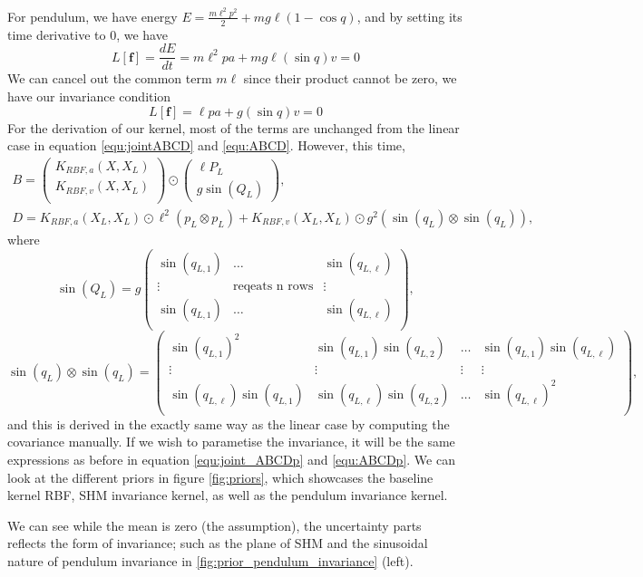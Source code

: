 \documentclass{statsmsc}
\begin{document}
For pendulum, we have energy $E=\frac{m\ell^2p^2}{2}+mg\ell(1-\cos q)$, and by setting its time derivative to 0, we have 
$$L[\mathbf{f}]=\frac{dE}{dt}=m\ell^2pa+mg\ell(\sin q)v=0$$
We can cancel out the common term $m\ell$ since their product cannot be zero, we have our invariance condition 
$$L[\mathbf{f}]=\ell pa+g(\sin q)v=0$$
For the derivation of our kernel, most of the terms are unchanged from the linear case in equation \ref{equ:jointABCD} and \ref{equ:ABCD}. 
However, this time, 
$$
\begin{gathered}
B=\begin{pmatrix}
    K_{RBF,a}(X, X_L) \\ K_{RBF,v}(X, X_L) \\
\end{pmatrix}\odot \begin{pmatrix}
    \ell P_L \\ g\sin(Q_L)
\end{pmatrix},\\ D=K_{RBF,a}(X_L, X_L)\odot \ell^2(p_L\otimes p_L) + K_{RBF,v}(X_L, X_L)\odot g^2(\sin(q_L)\otimes \sin(q_L)),
\end{gathered}
$$
where 
$$
\sin(Q_L) = g\begin{pmatrix}
  \sin(q_{L,1})  & \dots & \sin(q_{L,\ell})  \\
  \vdots & \text{reqeats n rows} &  \vdots\\
  \sin(q_{L,1})  & \dots & \sin(q_{L,\ell})  \\
\end{pmatrix},
$$
$$
\sin(q_L)\otimes \sin(q_L)=\begin{pmatrix}
  \sin(q_{L,1})^2 & \sin(q_{L,1})\sin(q_{L,2}) & \dots & \sin(q_{L,1})\sin(q_{L,\ell}) \\
  \vdots & \vdots & \vdots & \vdots \\
  \sin(q_{L,\ell})\sin(q_{L,1}) & \sin(q_{L,\ell})\sin(q_{L,2}) & \dots & \sin(q_{L,\ell})^2 \\
\end{pmatrix},
$$
and this is derived in the exactly same way as the linear case by computing the covariance manually. 
If we wish to parametise the invariance, it will be the same expressions as before in equation \ref{equ:joint_ABCDp} and \ref{equ:ABCDp}.
We can look at the different priors in figure \ref{fig:priors}, which showcases the baseline kernel RBF, SHM invariance kernel, as well as the pendulum invariance kernel.

We can see while the mean is zero (the assumption), the uncertainty parts reflects the form of invariance; such as the plane of SHM and the sinusoidal nature of pendulum invariance in \ref{fig:prior_pendulum_invariance} (left).
\end{document}
